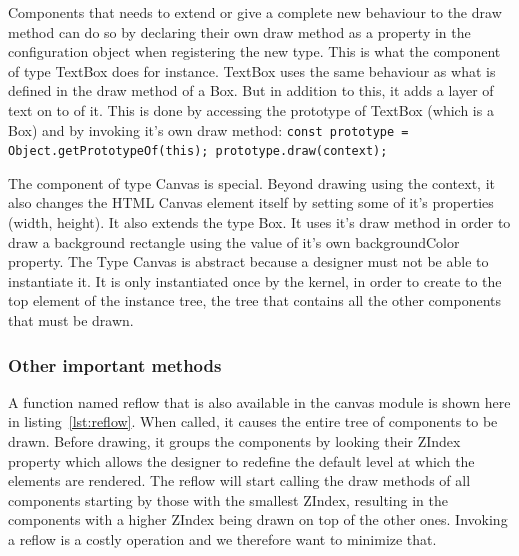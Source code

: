 Components that needs to extend or give a complete new behaviour to the draw method can do so by declaring their own draw method as a property in the configuration object when registering the new type. This is what the component of type TextBox does for instance. TextBox uses the same behaviour as what is defined in the draw method of a Box. But in addition to this, it adds a layer of text on to of it. This is done by accessing the prototype of TextBox (which is a Box) and by invoking it's own draw method: \texttt{const prototype = Object.getPrototypeOf(this); prototype.draw(context);}

The component of type Canvas is special. Beyond drawing using the context, it also changes the HTML Canvas element itself by setting some of it's properties (width, height). It also extends the type Box. It uses it's draw method in order to draw a background rectangle using the value of it's own backgroundColor property. The Type Canvas is abstract because a designer must not be able to instantiate it. It is only instantiated once by the kernel, in order to create to the top element of the instance tree, the tree that contains all the other components that must be drawn.

\subsubsection{Other important methods}



A function named reflow that is also available in the canvas module is shown here in listing~\ref{lst:reflow}. When called, it causes the entire tree of components to be drawn. Before drawing, it groups the components by looking their ZIndex property which allows the designer to redefine the default level at which the elements are rendered. The reflow will start calling the draw methods of all components starting by those with the smallest ZIndex, resulting in the components with a higher ZIndex being drawn on top of the other ones. Invoking a reflow is a costly operation and we therefore want to minimize that.



